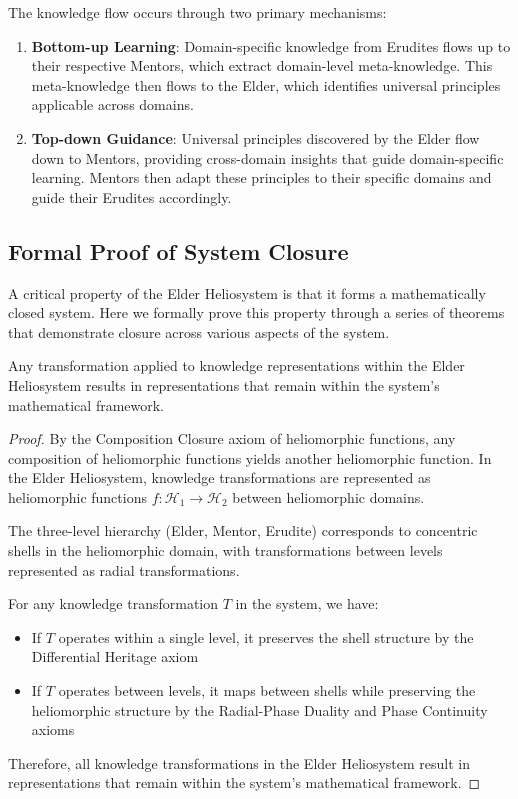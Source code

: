 The knowledge flow occurs through two primary mechanisms:

\begin{enumerate}
    \item \textbf{Bottom-up Learning}: Domain-specific knowledge from Erudites flows up to their respective Mentors, which extract domain-level meta-knowledge. This meta-knowledge then flows to the Elder, which identifies universal principles applicable across domains.
    
    \item \textbf{Top-down Guidance}: Universal principles discovered by the Elder flow down to Mentors, providing cross-domain insights that guide domain-specific learning. Mentors then adapt these principles to their specific domains and guide their Erudites accordingly.
\end{enumerate}

\subsection{Formal Proof of System Closure}

A critical property of the Elder Heliosystem is that it forms a mathematically closed system. Here we formally prove this property through a series of theorems that demonstrate closure across various aspects of the system.

\begin{theorem}
Any transformation applied to knowledge representations within the Elder Heliosystem results in representations that remain within the system's mathematical framework.
\end{theorem}

\begin{proof}
By the Composition Closure axiom of heliomorphic functions, any composition of heliomorphic functions yields another heliomorphic function. In the Elder Heliosystem, knowledge transformations are represented as heliomorphic functions $f: \mathcal{H}_1 \rightarrow \mathcal{H}_2$ between heliomorphic domains.

The three-level hierarchy (Elder, Mentor, Erudite) corresponds to concentric shells in the heliomorphic domain, with transformations between levels represented as radial transformations.

For any knowledge transformation $T$ in the system, we have:
\begin{itemize}
    \item If $T$ operates within a single level, it preserves the shell structure by the Differential Heritage axiom
    \item If $T$ operates between levels, it maps between shells while preserving the heliomorphic structure by the Radial-Phase Duality and Phase Continuity axioms
\end{itemize}

Therefore, all knowledge transformations in the Elder Heliosystem result in representations that remain within the system's mathematical framework.
\end{proof}

